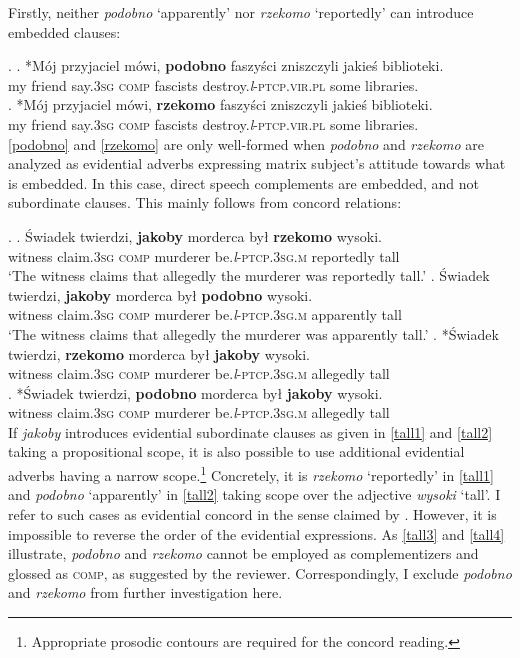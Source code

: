 \documentclass[output=paper
,modfonts
,nonflat]{langsci/langscibook}
\newcommand{\glossformat}[1]{\textsc{#1}}
\newcommand{\thirdperson}{\glossformat{3}\xspace}
\newcommand{\comp}{\glossformat{comp}\xspace}
\newcommand{\lptcp}{\emph{l}\glossformat{-ptcp}\xspace}
\newcommand{\masc}{\glossformat{m}\xspace}
\newcommand{\pl}{\glossformat{pl}\xspace}
\newcommand{\sg}{\glossformat{sg}\xspace}
\newcommand{\vir}{\glossformat{vir}\xspace}
\begin{document}
Firstly, neither \emph{podobno}  `apparently' nor \emph{rzekomo} `reportedly' can introduce embedded clauses:  

\ex.	\ag.	*Mój przyjaciel mówi, \textbf{podobno} faszyści zniszczyli jakieś biblioteki.  \label{podobno} \\
		my friend say.{\thirdperson}{\sg} {\comp}  fascists destroy.{\lptcp}.{\vir}.{\pl} some libraries. \\
	\bg.	*Mój przyjaciel mówi, \textbf{rzekomo} faszyści zniszczyli jakieś biblioteki. \label{rzekomo} \\
		my friend say.{\thirdperson}{\sg} {\comp}  fascists destroy.{\lptcp}.{\vir}.{\pl} some libraries. \\

\ref{podobno} and \ref{rzekomo} are only well-formed when \emph{podobno} and \emph{rzekomo} are analyzed as evidential adverbs expressing matrix subject's attitude towards what is embedded. In this case, direct speech complements are embedded, and not subordinate clauses.  This mainly follows from concord relations: 

\ex.	\ag.	Świadek twierdzi, \textbf{jakoby} morderca był \textbf{rzekomo} wysoki. \label{tall1} \\
		witness claim.{\thirdperson}{\sg} {\comp} murderer be.{\lptcp}.{\thirdperson}{\sg}.{\masc} reportedly tall \\
		 `The witness claims that allegedly the murderer was reportedly tall.' 
	\bg.	Świadek twierdzi, \textbf{jakoby} morderca był \textbf{podobno} wysoki. \label{tall2} \\
		witness claim.{\thirdperson}{\sg} {\comp} murderer be.{\lptcp}.{\thirdperson}{\sg}.{\masc} apparently tall \\
		 `The witness claims that allegedly the murderer was apparently tall.'
	\cg.	*Świadek twierdzi, \textbf{rzekomo} morderca był \textbf{jakoby} wysoki. \label{tall3} \\
		witness claim.{\thirdperson}{\sg} {\comp} murderer be.{\lptcp}.{\thirdperson}{\sg}.{\masc} allegedly tall \\
	\dg.	*Świadek twierdzi, \textbf{podobno} morderca był \textbf{jakoby} wysoki. \label{tall4} \\
		witness claim.{\thirdperson}{\sg} {\comp} murderer be.{\lptcp}.{\thirdperson}{\sg}.{\masc} allegedly tall \\

If \emph{jakoby} introduces evidential subordinate clauses as given in \ref{tall1} and \ref{tall2} taking a propositional scope, it is also possible to use additional evidential adverbs having a narrow scope.\footnote{Appropriate prosodic contours are required for the concord reading. 
}
Concretely, it is \emph{rzekomo}  `reportedly' in \ref{tall1} and \emph{podobno} `apparently' in \ref{tall2} taking scope over the adjective \emph{wysoki} `tall'. I refer to such cases as evidential concord in the sense claimed by \textcite{Schenner2007}. However, it is impossible to reverse the order of the evidential expressions. As \ref{tall3} and \ref{tall4} illustrate, \emph{podobno} and \emph{rzekomo} cannot be employed as complementizers and glossed as {\comp}, as suggested by the reviewer. Correspondingly, I exclude \emph{podobno} and \emph{rzekomo} from further investigation here. 
\end{document}
